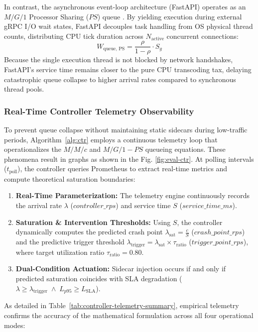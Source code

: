 \documentclass{ieeeaccess}
\begin{document}
In contrast, the asynchronous event-loop architecture (FastAPI) operates as an $M/G/1$ Processor Sharing ($PS$) queue \cite{kahraman2011distribution,dalai2024novel}. By yielding execution during external gRPC I/O wait states, FastAPI decouples task handling from OS physical thread counts, distributing CPU tick duration across $N_{\text{active}}$ concurrent connections:
\begin{equation}
	W_{\text{queue, PS}} = \frac{\rho}{1 - \rho} \cdot S_{g}
\end{equation}
Because the single execution thread is not blocked by network handshakes, FastAPI's service time remains closer to the pure CPU transcoding tax, delaying catastrophic queue collapse to higher arrival rates compared to synchronous thread pools.

\subsubsection{Real-Time Controller Telemetry Observability}
To prevent queue collapse without maintaining static sidecars during low-traffic periods, Algorithm~\ref{alg:ctr} employs a continuous telemetry loop that operationalizes the $M/M/c$ and $M/G/1-PS$ queueing equations. These phenomena result in graphs as shown in the Fig. \ref{fig:eval-ctr}. At polling intervals ($t_{\text{poll}}$), the controller queries Prometheus to extract real-time metrics and compute theoretical saturation boundaries:

\begin{enumerate}
	\item \textbf{Real-Time Parameterization:} The telemetry engine continuously records the arrival rate $\lambda$ ($controller\_rps$) and service time $S$ ($service\_time\_ms$).
	\item \textbf{Saturation \& Intervention Thresholds:} Using $S$, the controller dynamically computes the predicted crash point $\lambda_{\text{sat}} = \frac{c}{S}$ ($crash\_point\_rps$) and the predictive trigger threshold $\lambda_{\text{trigger}} = \lambda_{\text{sat}} \times \tau_{\text{ratio}}$ ($trigger\_point\_rps$), where target utilization ratio $\tau_{\text{ratio}} = 0.80$.
	\item \textbf{Dual-Condition Actuation:} Sidecar injection occurs if and only if predicted saturation coincides with SLA degradation ($\lambda \ge \lambda_{\text{trigger}} \;\land\; L_{p95} \ge L_{\text{SLA}}$).
\end{enumerate}

As detailed in Table~\ref{tab:controller-telemetry-summary}, empirical telemetry confirms the accuracy of the mathematical formulation across all four operational modes:
\end{document}
